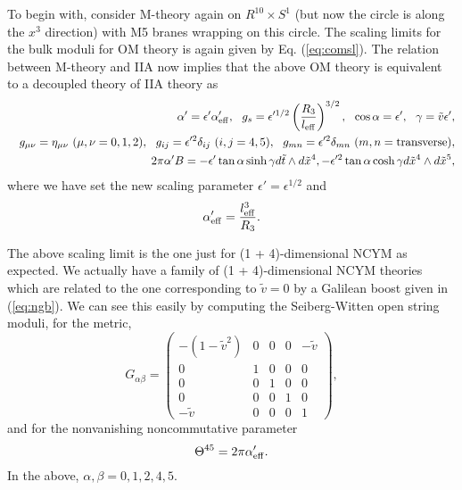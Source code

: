 \documentclass[a4paper,12pt]{article}
\begin{document}
	To begin with, consider M-theory again on $R^{10}\times S^1$
(but now the circle is along the $x^3$ direction) with M5 branes
wrapping on this circle. The scaling limits for the bulk moduli for OM
theory is again given by Eq. (\ref{eq:comsl}). The relation between
M-theory and IIA now implies that the above OM theory is equivalent to a
decoupled theory of IIA theory as
\begin{eqnarray}
&&\alpha' = \epsilon' \alpha'_{\rm eff}, \ \ g_s = \epsilon'^{1/2} 
\left(\frac{R_3}{l_{\rm eff}}\right)^{3/2}, \ \  \cos\alpha =
\epsilon', \ \ \gamma = \tilde v  
\epsilon',\nonumber\\
&&g_{\mu\nu} = \eta_{\mu\nu}~(\mu,
\nu = 0, 1, 2), \ \ g_{ij} = \epsilon'^2 \delta_{ij}~ (i, j =  4, 5),\ \
g_{m n}  = \epsilon'^2 \delta_{mn}~ (m, n = {\rm transverse}),\nonumber\\
&& 2\pi\alpha' B = - \epsilon' \tan\alpha \sinh\gamma d\tilde t \wedge    
d\tilde x^4, - \epsilon'^2 \tan\alpha \cosh\gamma
d\tilde x^4 \wedge d\tilde x^5,
\label{eq:ncymdl}
\end{eqnarray}
where we have set the new scaling parameter $\epsilon' = \epsilon^{1/2}$
and 
\begin{equation}
\alpha'_{\rm eff} = \frac{l^3_{\rm eff}}{R_3}.
\label{eq:a}
\end{equation}

	The above scaling limit is the one just for (1 + 4)-dimensional
NCYM as expected. We actually have a family of (1 + 4)-dimensional NCYM 
theories which are related to the one corresponding to $\tilde v = 0$ by
a Galilean boost given in (\ref{eq:ngb}). We can see this easily by
computing the Seiberg-Witten open string moduli, for the metric,
\begin{equation}
G_{\alpha\beta} = \left(\begin{array}{ccccc}                           
                                - (1 - \tilde v^2)&0&0&0&- \tilde v\\
                                  0&1&0&0&0\\
                                  0&0&1&0&0\\
                                  0&0&0&1&0\\
                                 -\tilde v&0&0&0&1\end{array}\right),
\end{equation}
and for the nonvanishing noncommutative parameter
\begin{equation}
 \Theta^{45} = 2\pi\alpha'_{\rm eff}.
\end{equation}
In the above, $\alpha, \beta = 0, 1, 2, 4, 5$.
\end{document}
